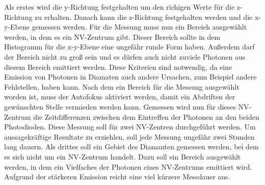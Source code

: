 Als erstes wird die y-Richtung festgehalten um den richigen Werte f\"ur die z-Richtung zu erhalten. 
Danach kann die z-Richtung festgehalten werden und die x-y-Ebene gemessen werden. 
F\"ur die Messung muss nun ein Bereich ausgew\"ahlt werden, in dem es  ein NV-Zentrum gibt.  
Dieser Bereich sollte in dem Histogramm f\"ur die x-y-Ebene eine ungef\"ahr runde Form haben. 
Au{\ss}erdem darf der Bereich nicht zu gro{\ss} sein und es d\"urfen auch nicht zuviele Photonen aus diesem Bereich emittiert werden. 
Diese Kriterien sind notwendig, da eine Emission von Photonen in Diamaten auch andere Ursachen, zum Beispiel andere Fehlstellen, haben kann. 
Nach dem ein Bereich f\"ur die Messung ausgew\"ahlt worden ist, muss der Autofokus aktiviert werden, damit ein Abdriften der gew\"unschten Stelle vermieden werden kann. Gemessen wird nun f\"ur dieses NV-Zentrum die Zeitdifferenzen zwischen dem Eintreffen der Photonen an den beiden Photodioden. 
Diese Messung soll f\"ur zwei NV-Zentren durchgef\"uhrt werden. 
Um aussagekr\"aftige Resultate zu erziehlen, soll jede Messung ungef\"ahr zwei Stunden lang dauern. 
Als drittes soll ein Gebiet des Diamanten gemessen werden, bei dem es sich nicht um ein NV-Zentrum handelt. 
Dazu soll ein Bereich ausgew\"ahlt werden, in dem ein Vielfaches der Photonen eines NV-Zentrums emittiert wird. Aufgrund der stärkeren Emission reicht eine viel kürzere Messdauer aus. 


